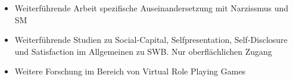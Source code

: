 \begin{itemize}
\item Weiterführende Arbeit spezifische Auseinandersetzung mit Narzissmus und SM
\item Weiterführende Studien zu Social-Capital, Selfpresentation, Self-Disclosure und Satisfaction im Allgemeinen zu SWB. Nur oberflächlichen Zugang
\item Weitere Forschung im Bereich von Virtual Role Playing Games
\end{itemize}
